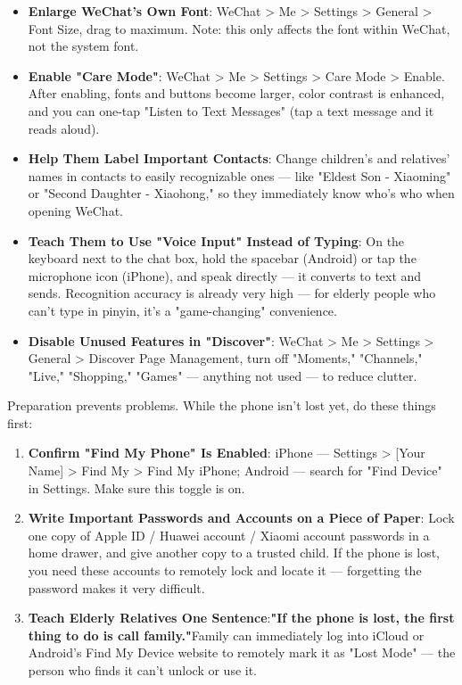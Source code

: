\begin{itemize}
  \item \textbf{Enlarge WeChat's Own Font}: WeChat > Me > Settings > General > Font Size, drag to maximum. Note: this only affects the font within WeChat, not the system font.
  \item \textbf{Enable "Care Mode"}: WeChat > Me > Settings > Care Mode > Enable. After enabling, fonts and buttons become larger, color contrast is enhanced, and you can one-tap "Listen to Text Messages" (tap a text message and it reads aloud).
  \item \textbf{Help Them Label Important Contacts}: Change children's and relatives' names in contacts to easily recognizable ones — like "Eldest Son - Xiaoming" or "Second Daughter - Xiaohong," so they immediately know who's who when opening WeChat.
  \item \textbf{Teach Them to Use "Voice Input" Instead of Typing}: On the keyboard next to the chat box, hold the spacebar (Android) or tap the microphone icon (iPhone), and speak directly — it converts to text and sends. Recognition accuracy is already very high — for elderly people who can't type in pinyin, it's a "game-changing" convenience.
  \item \textbf{Disable Unused Features in "Discover"}: WeChat > Me > Settings > General > Discover Page Management, turn off "Moments," "Channels," "Live," "Shopping," "Games" — anything not used — to reduce clutter.
\end{itemize}


Preparation prevents problems. While the phone isn't lost yet, do these things first:

\begin{enumerate}
  \item \textbf{Confirm "Find My Phone" Is Enabled}: iPhone — Settings > [Your Name] > Find My > Find My iPhone; Android — search for "Find Device" in Settings. Make sure this toggle is on.
  \item \textbf{Write Important Passwords and Accounts on a Piece of Paper}: Lock one copy of Apple ID / Huawei account / Xiaomi account passwords in a home drawer, and give another copy to a trusted child. If the phone is lost, you need these accounts to remotely lock and locate it — forgetting the password makes it very difficult.
  \item \textbf{Teach Elderly Relatives One Sentence}:\textbf{"If the phone is lost, the first thing to do is call family."}Family can immediately log into iCloud or Android's Find My Device website to remotely mark it as "Lost Mode" — the person who finds it can't unlock or use it.
\end{enumerate}

